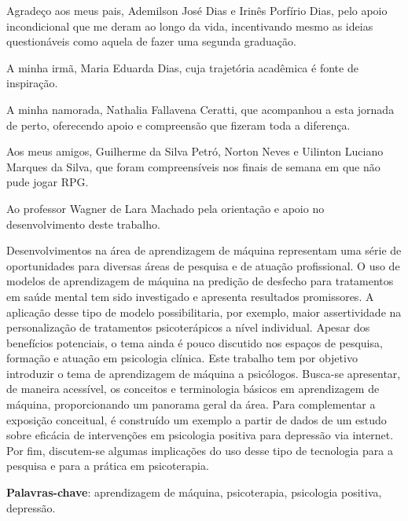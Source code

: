 \documentclass[
	12pt,				        %
	openany,			        %
	oneside,			        %
	a4paper,			        %
	english,			        %
	brazil				        %
	]{abntex2}
\begin{document}
\begin{agradecimentos}
Agradeço aos meus pais, Ademilson José Dias e Irinês Porfírio Dias, pelo apoio incondicional que me deram ao longo da vida,
incentivando mesmo as ideias questionáveis como aquela de fazer uma segunda graduação.

A minha irmã, Maria Eduarda Dias, cuja trajetória acadêmica é fonte de inspiração.

A minha namorada, Nathalia Fallavena Ceratti, que acompanhou a esta jornada de perto, oferecendo apoio e compreensão que
fizeram toda a diferença.

Aos meus amigos, Guilherme da Silva Petró, Norton Neves e Uilinton Luciano Marques da Silva, que foram compreensíveis nos
finais de semana em que não pude jogar RPG.

Ao professor Wagner de Lara Machado pela orientação e apoio no desenvolvimento deste trabalho.
\end{agradecimentos}


\setlength{\absparsep}{18pt} %
\begin{resumo}
Desenvolvimentos na área de aprendizagem de máquina representam uma série de oportunidades para diversas áreas de pesquisa e de atuação profissional.
O uso de modelos de aprendizagem de máquina na predição de desfecho para tratamentos em saúde mental tem sido investigado e apresenta resultados promissores.
A aplicação desse tipo de modelo possibilitaria, por exemplo, maior assertividade na personalização de tratamentos psicoterápicos a nível individual.
Apesar dos benefícios potenciais, o tema ainda é pouco discutido nos espaços de pesquisa, formação e atuação em psicologia clínica. Este trabalho tem
por objetivo introduzir o tema de aprendizagem de máquina a psicólogos. Busca-se apresentar, de maneira acessível, os conceitos e terminologia básicos
em aprendizagem de máquina, proporcionando um panorama geral da área. Para complementar a exposição conceitual, é construído um exemplo a partir de dados
de um estudo sobre eficácia de intervenções em psicologia positiva para depressão via internet. Por fim, discutem-se algumas implicações do uso desse tipo
de tecnologia para a pesquisa e para a prática em psicoterapia.

 \textbf{Palavras-chave}: aprendizagem de máquina, psicoterapia, psicologia positiva, depressão.
\end{resumo}
\end{document}

